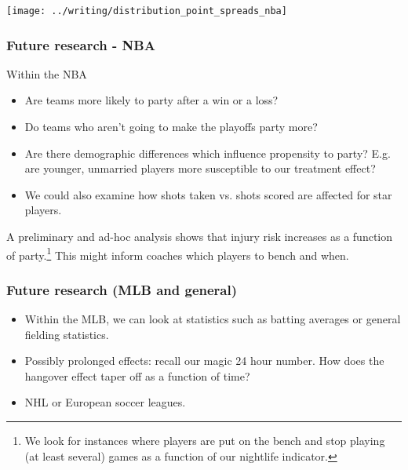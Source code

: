\documentclass{beamer}
\begin{document}
\begin{frame}
  \centering
  \texttt{[image: ../writing/distribution\_point\_spreads\_nba]}
\end{frame}

\begin{frame}   \frametitle{Future research - NBA}
  Within the NBA
  \begin{itemize}     
    \item Are teams more likely to party after a win or a       loss?
    \item Do teams who aren't going to make the playoffs party more?
    \item Are there demographic differences which influence propensity to party? E.g. are younger, unmarried players more susceptible to our treatment effect?
    \item We could also examine how shots taken vs. shots scored are affected for star players.
  \end{itemize}
  \vspace{12pt}  A preliminary and ad-hoc analysis shows that injury risk increases as a function of party.\footnote{We look for instances where players are put on the bench and stop playing (at least several) games as a function of our nightlife indicator.}
  This might inform coaches which players to bench and when.

\end{frame}

\begin{frame}   \frametitle{Future research (MLB and general)}
  \begin{itemize}     
    \item Within the MLB, we can look at statistics such as batting averages or general fielding statistics. 
    \vspace{12pt}
    \item Possibly prolonged effects: recall our magic 24 hour number.
      How does the hangover effect taper off as a function of time?
    \vspace{12pt}
    \item NHL or European soccer leagues.   
  \end{itemize} 
\end{frame}
\end{document}
